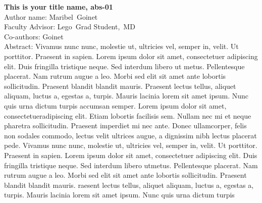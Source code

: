 \documentclass[float=false, crop=false]{standalone}
\begin{document}
\textbf{This is your title name, abs-01}\\\noindent
Author name: Maribel~Goinet \\\noindent
Faculty Advisor: Lego~Grad Student,~MD\\\noindent
Co-authors: Goinet \\\noindent
Abstract: Vivamus nunc nunc, molestie ut, ultricies vel, semper in, velit. Ut porttitor. Praesent in sapien. Lorem ipsum dolor sit amet, consectetuer adipiscing elit. Duis fringilla tristique neque. Sed interdum libero ut metus. Pellentesque placerat. Nam rutrum augue a leo. Morbi sed elit sit amet ante lobortis sollicitudin. Praesent blandit blandit mauris. Praesent lectus tellus, aliquet aliquam, luctus a, egestas a, turpis. Mauris lacinia lorem sit amet ipsum. Nunc quis urna dictum turpis accumsan semper. Lorem ipsum dolor sit amet, consectetueradipiscing elit. Etiam lobortis facilisis sem. Nullam nec mi et neque pharetra sollicitudin. Praesent imperdiet mi nec ante. Donec ullamcorper, felis non sodales commodo, lectus velit ultrices augue, a dignissim nibh lectus placerat pede. Vivamus nunc nunc, molestie ut, ultricies vel, semper in, velit. Ut porttitor. Praesent in sapien. Lorem ipsum dolor sit amet, consectetuer adipiscing elit. Duis fringilla tristique neque. Sed interdum libero utmetus. Pellentesque placerat. Nam rutrum augue a leo. Morbi sed elit sit amet ante lobortis sollicitudin. Praesent blandit blandit mauris. raesent lectus tellus, aliquet aliquam, luctus a, egestas a, turpis. Mauris lacinia lorem sit amet ipsum. Nunc quis urna dictum turpis\\\newline
\end{document}
